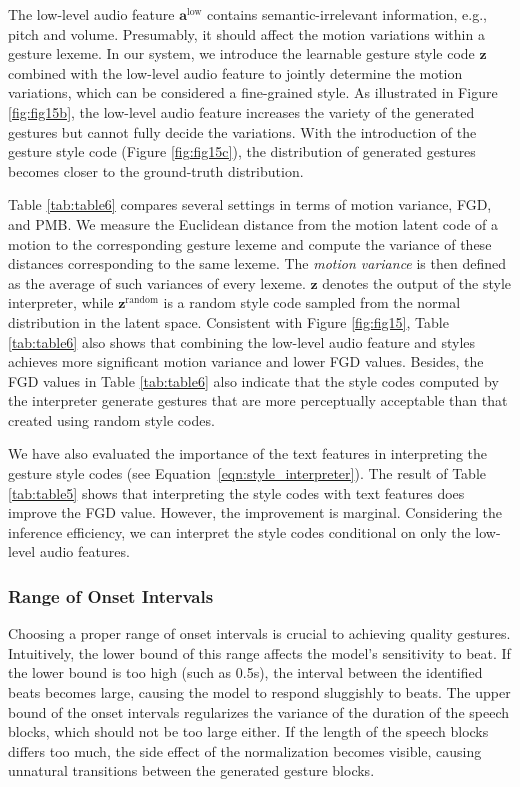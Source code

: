 \documentclass[acmtog,authorversion]{acmart}
\newcommand{\vect}[1]{\bm{#1}}
\newcommand{\eqword}[1]{{\text{#1}}}
\newcommand{\eqn}{Equation{}~}
\begin{document}
The low-level audio feature $\vect{a}^{\eqword{low}}$ contains semantic-irrelevant information, e.g., pitch and volume. Presumably, it should affect the motion variations within a gesture lexeme. In our system, we introduce the learnable gesture style code $\vect{z}$ combined with the low-level audio feature to jointly determine the motion variations, which can be considered a fine-grained style.
As illustrated in Figure \ref{fig:fig15b}, the low-level audio feature increases the variety of the generated gestures but cannot fully decide the variations. With the introduction of the gesture style code (Figure \ref{fig:fig15c}), the distribution of generated gestures becomes closer to the ground-truth distribution. 

Table \ref{tab:table6} compares several settings in terms of motion variance, FGD, and PMB. We measure the Euclidean distance from the motion latent code of a motion to the corresponding gesture lexeme and compute the variance of these distances corresponding to the same lexeme. The \emph{motion variance} is then defined as the average of such variances of every lexeme. $\vect{z}$ denotes the output of the style interpreter, while $\vect{z}^{\eqword{random}}$ is a random style code sampled from the normal distribution in the latent space. Consistent with Figure \ref{fig:fig15}, Table \ref{tab:table6} also shows that combining the low-level audio feature and styles achieves more significant motion variance and lower FGD values. Besides, the FGD values in Table \ref{tab:table6} also indicate that the style codes computed by the interpreter generate gestures that are more perceptually acceptable than that created using random style codes.

We have also evaluated the importance of the text features in interpreting the gesture style codes (see \eqn\ref{eqn:style_interpreter}).
The result of Table \ref{tab:table5} shows that interpreting the style codes 
with text features does improve the FGD value. However, the improvement is marginal. Considering the inference efficiency, we can interpret the style codes conditional on only the low-level audio features.

\subsubsection{Range of Onset Intervals}
\label{subsubsec:onset_interval}
Choosing a proper range of onset intervals is crucial to achieving quality gestures. Intuitively, the lower bound of this range affects the model's sensitivity to beat. If the lower bound is too high (such as 0.5s), the interval between the identified beats becomes large, causing the model to respond sluggishly to beats. The upper bound of the onset intervals regularizes the variance of the duration of the speech blocks, which should not be too large either. If the length of the speech blocks differs too much, the side effect of the normalization becomes visible, causing unnatural transitions between the generated gesture blocks. 
\end{document}
